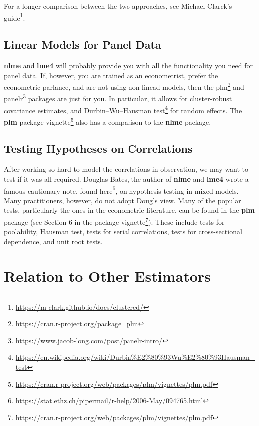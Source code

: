 \documentclass[]{book}
\renewcommand{\href}[2]{#2\footnote{\url{#1}}}
\theoremstyle{definition}
\theoremstyle{definition}
\theoremstyle{definition}
\theoremstyle{remark}
\begin{document}
For a longer comparison between the two approaches, see \href{https://m-clark.github.io/docs/clustered/}{Michael Clarck's guide}.

\hypertarget{linear-models-for-panel-data}{%
\subsection{Linear Models for Panel Data}\label{linear-models-for-panel-data}}

\textbf{nlme} and \textbf{lme4} will probably provide you with all the functionality you need for panel data.
If, however, you are trained as an econometrist, prefer the econometric parlance, and are not using non-linead models, then the \href{https://cran.r-project.org/package=plm}{plm} and \href{https://www.jacob-long.com/post/panelr-intro/}{panelr} packages are just for you.
In particular, it allows for cluster-robust covariance estimates, and \href{https://en.wikipedia.org/wiki/Durbin\%E2\%80\%93Wu\%E2\%80\%93Hausman_test}{Durbin--Wu--Hausman test} for random effects.
The \textbf{plm} \href{https://cran.r-project.org/web/packages/plm/vignettes/plm.pdf}{package vignette} also has a comparison to the \textbf{nlme} package.

\hypertarget{testing-hypotheses-on-correlations}{%
\subsection{Testing Hypotheses on Correlations}\label{testing-hypotheses-on-correlations}}

After working so hard to model the correlations in observation, we may want to test if it was all required.
Douglas Bates, the author of \textbf{nlme} and \textbf{lme4} wrote a famous cautionary note, \href{https://stat.ethz.ch/pipermail/r-help/2006-May/094765.html}{found here}, on hypothesis testing in mixed models.
Many practitioners, however, do not adopt Doug's view.
Many of the popular tests, particularly the ones in the econometric literature, can be found in the \textbf{plm} package (see Section 6 in the \href{https://cran.r-project.org/web/packages/plm/vignettes/plm.pdf}{package vignette}).
These include tests for poolability, Hausman test, tests for serial correlations, tests for cross-sectional dependence, and unit root tests.

\hypertarget{relation-to-other-estimators}{%
\section{Relation to Other Estimators}\label{relation-to-other-estimators}}
\end{document}
